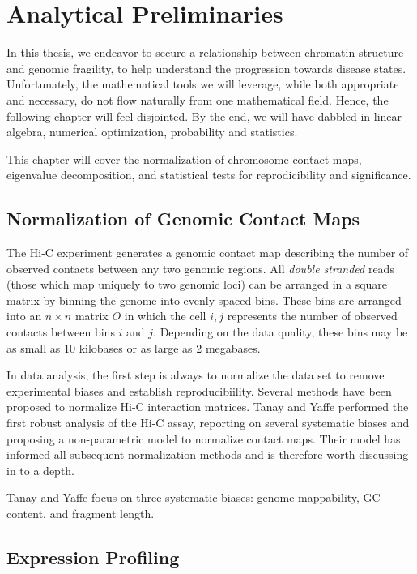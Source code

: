 
\chapter{Analytical Preliminaries}

In this thesis, we endeavor to secure a relationship between chromatin structure and genomic fragility, to help understand the
progression towards disease states.  Unfortunately, the mathematical tools we will leverage, while both appropriate and necessary,
do not flow naturally from one mathematical field.  Hence, the following chapter will feel disjointed.  By the end, we will have
dabbled in linear algebra, numerical optimization, probability and statistics.

This chapter will cover the normalization of chromosome contact maps, eigenvalue decomposition, and statistical tests for
reprodicibility and significance.

\section*{Normalization of Genomic Contact Maps}

The Hi-C experiment generates a genomic contact map describing the number of observed contacts between any two genomic
regions.  All \textit{double stranded} reads (those which map uniquely to two genomic loci) can be arranged in a square
matrix by binning the genome into evenly spaced bins.  These bins are arranged into an $n \times n$ matrix $O$ in which the
cell $i,j$ represents the number of observed contacts between bins $i$ and $j$.  Depending on the data quality, these bins
may be as small as 10 kilobases or as large as 2 megabases.

In data analysis, the first step is always to normalize the data set to remove experimental biases and establish reproducibiility.
Several methods have been proposed to normalize Hi-C interaction matrices.  Tanay and Yaffe\cite{tanay2011} performed the first
robust analysis of the Hi-C assay, reporting on several systematic biases and proposing a non-parametric model to normalize contact
maps.  Their model has informed all subsequent normalization methods and is therefore worth discussing in to a depth.

Tanay and Yaffe focus on three systematic biases: genome mappability, GC content, and fragment length.




\section*{Expression Profiling}

